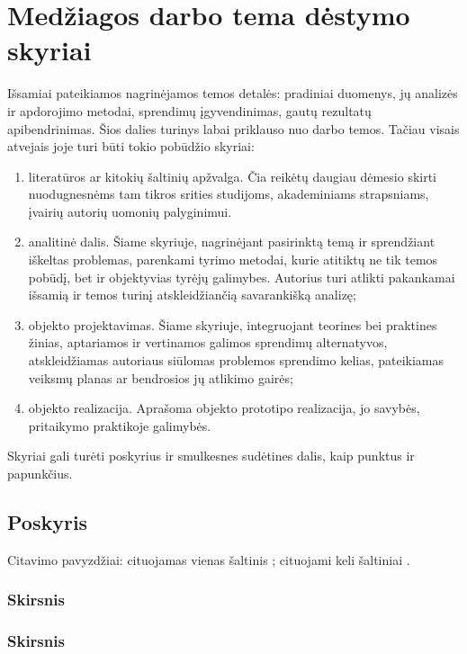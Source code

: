 \documentclass{VUMIFPSmagistrinis}
\begin{document}
\section{Medžiagos darbo tema dėstymo skyriai}
Išsamiai pateikiamos nagrinėjamos temos detalės: pradiniai duomenys, jų
analizės ir apdorojimo metodai, sprendimų įgyvendinimas, gautų rezultatų
apibendrinimas. Šios dalies turinys labai priklauso nuo darbo temos. Tačiau
visais atvejais joje turi būti tokio pobūdžio skyriai:
\begin{enumerate}
    \item literatūros ar kitokių šaltinių apžvalga. Čia reikėtų daugiau dėmesio
        skirti nuodugnesnėms tam tikros srities studijoms, akademiniams
        strapsniams, įvairių autorių uomonių palyginimui.
    \item analitinė dalis. Šiame skyriuje, nagrinėjant pasirinktą temą ir
        sprendžiant iškeltas problemas, parenkami tyrimo metodai, kurie
        atitiktų ne tik temos pobūdį, bet ir objektyvias tyrėjų galimybes.
        Autorius turi atlikti pakankamai išsamią ir temos turinį
        atskleidžiančią savarankišką analizę;
    \item objekto projektavimas. Šiame skyriuje, integruojant teorines bei
        praktines žinias, aptariamos ir vertinamos galimos sprendimų
        alternatyvos, atskleidžiamas autoriaus siūlomas problemos sprendimo
        kelias, pateikiamas veiksmų planas ar bendrosios jų atlikimo gairės;
    \item objekto realizacija. Aprašoma objekto prototipo realizacija, jo
        savybės, pritaikymo praktikoje galimybės.
\end{enumerate}
Skyriai gali turėti poskyrius ir smulkesnes sudėtines dalis, kaip punktus ir
papunkčius.

\subsection{Poskyris}
Citavimo pavyzdžiai: cituojamas vienas šaltinis \cite{PvzStraipsnLt}; cituojami
keli šaltiniai \cite{PvzStraipsnEn, PvzKonfLt, PvzKonfEn, PvzKnygLt, PvzKnygEn,
PvzElPubLt, PvzElPubEn, PvzMagistrLt, PvzPhdEn}.

\subsubsection{Skirsnis}
\subsubsection{Skirsnis}
\end{document}
